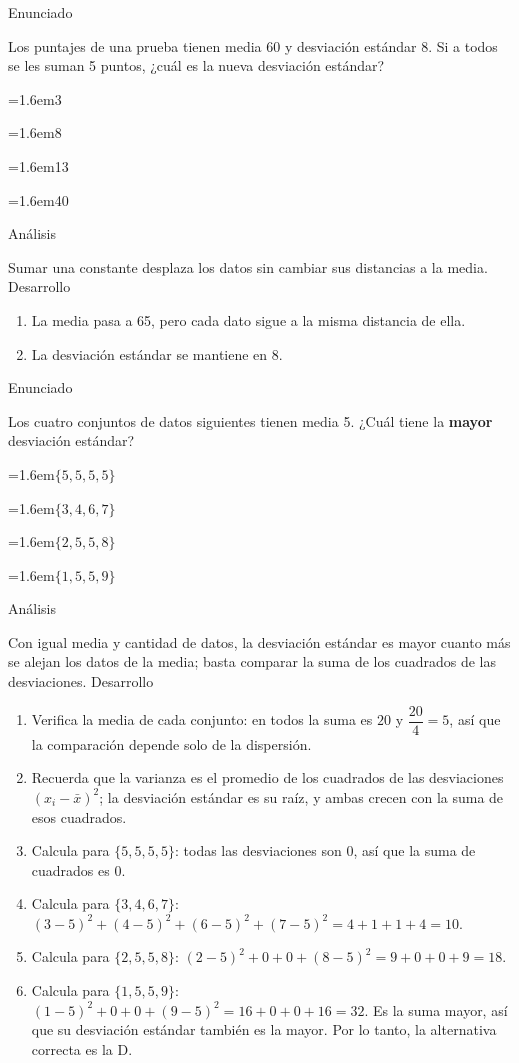 \documentclass[10pt,a4paper,twocolumn]{article}
\newcommand{\alternativa}[2]{\par\noindent\hangindent=1.6em\hangafter=1\makebox[1.6em][l]{\tecla{#1}}#2\par}
\newcommand{\clave}[1]{\par\smallskip{\sffamily\footnotesize\color{esmeralda} Clave \teclaok{#1}}\par}
\begin{document}
\begin{ejemplo}
{\sffamily\footnotesize\color{zinc500} Enunciado}\par
Los puntajes de una prueba tienen media 60 y desviación estándar 8. Si a todos se les suman 5 puntos, ¿cuál es la nueva desviación estándar?
\alternativa{A}{3}
\alternativa{B}{8}
\alternativa{C}{13}
\alternativa{D}{40}
\clave{B}
{\sffamily\footnotesize\color{zinc500} Análisis}\par Sumar una constante desplaza los datos sin cambiar sus distancias a la media.
{\sffamily\footnotesize\color{zinc500} Desarrollo}
\begin{enumerate}
  \item La media pasa a 65, pero cada dato sigue a la misma distancia de ella.
  \item La desviación estándar se mantiene en 8.
\end{enumerate}
\end{ejemplo}

\begin{ejemplo}
{\sffamily\footnotesize\color{zinc500} Enunciado}\par
Los cuatro conjuntos de datos siguientes tienen media 5. ¿Cuál tiene la \textbf{mayor} desviación estándar?
\alternativa{A}{$\{5, 5, 5, 5\}$}
\alternativa{B}{$\{3, 4, 6, 7\}$}
\alternativa{C}{$\{2, 5, 5, 8\}$}
\alternativa{D}{$\{1, 5, 5, 9\}$}
\clave{D}
{\sffamily\footnotesize\color{zinc500} Análisis}\par Con igual media y cantidad de datos, la desviación estándar es mayor cuanto más se alejan los datos de la media; basta comparar la suma de los cuadrados de las desviaciones.
{\sffamily\footnotesize\color{zinc500} Desarrollo}
\begin{enumerate}
  \item Verifica la media de cada conjunto: en todos la suma es $20$ y $\dfrac{20}{4} = 5$, así que la comparación depende solo de la dispersión.
  \item Recuerda que la varianza es el promedio de los cuadrados de las desviaciones $(x_i - \bar{x})^2$; la desviación estándar es su raíz, y ambas crecen con la suma de esos cuadrados.
  \item Calcula para $\{5,5,5,5\}$: todas las desviaciones son $0$, así que la suma de cuadrados es $0$.
  \item Calcula para $\{3,4,6,7\}$: $(3-5)^2 + (4-5)^2 + (6-5)^2 + (7-5)^2 = 4 + 1 + 1 + 4 = 10$.
  \item Calcula para $\{2,5,5,8\}$: $(2-5)^2 + 0 + 0 + (8-5)^2 = 9 + 0 + 0 + 9 = 18$.
  \item Calcula para $\{1,5,5,9\}$: $(1-5)^2 + 0 + 0 + (9-5)^2 = 16 + 0 + 0 + 16 = 32$. Es la suma mayor, así que su desviación estándar también es la mayor. Por lo tanto, la alternativa correcta es la D.
\end{enumerate}
\end{ejemplo}
\end{document}
